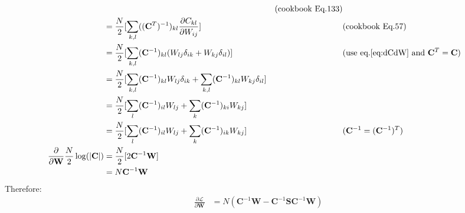 \documentclass[12pt]{article}
\newenvironment{question}[2][Question]{\begin{trivlist}
\kern10pt
\item[\hskip \labelsep {\bfseries #1}\hskip \labelsep {\bfseries #2.}]}{\end{trivlist}}
\begin{document}
\begin{question}{15}
\begin{align*}
      && (\text{cookbook Eq.133}) \\
  &= \frac{N}{2}[\sum_{k,l} ((\mathbf{C}^T)^{-1})_{kl}
                            \frac{\partial C_{kl}}{\partial W_{ij}} ]
      && (\text{cookbook Eq.57}) \\
  &= \frac{N}{2}[\sum_{k,l} (\mathbf{C}^{-1})_{kl}
                 (W_{lj}\delta_{ik} + W_{kj}\delta_{il})]
      && (\text{use eq.\eqref{eq:dCdW} and } \mathbf{C}^T = \mathbf{C}) \\
  &= \frac{N}{2}[\sum_{k,l} (\mathbf{C}^{-1})_{kl}W_{lj}\delta_{ik}
        + \sum_{k,l} (\mathbf{C}^{-1})_{kl}W_{kj}\delta_{il}] \\
  &= \frac{N}{2}[\sum_{l} (\mathbf{C}^{-1})_{il}W_{lj}
        + \sum_{k} (\mathbf{C}^{-1})_{ki}W_{kj}] \\
  &= \frac{N}{2}[\sum_{l} (\mathbf{C}^{-1})_{il}W_{lj}
        + \sum_{k} (\mathbf{C}^{-1})_{ik}W_{kj}]
      && (\mathbf{C}^{-1} = (\mathbf{C}^{-1})^T) \\
  \frac{\partial}{\partial \mathbf{W}}\frac{N}{2}\log(|\mathbf{C}|)
  &= \frac{N}{2}[2\mathbf{C}^{-1}\mathbf{W}] \\
  &= N\mathbf{C}^{-1}\mathbf{W}
\end{align*}
Therefore:
\begin{align*}
  \frac{\partial{\mathcal{L}}}{\partial{\mathbf{W}}} 
    &= N(\mathbf{C}^{-1}\mathbf{W} 
         - \mathbf{C}^{-1}\mathbf{S}\mathbf{C}^{-1}\mathbf{W})
\end{align*}

\end{question}
\end{document}
